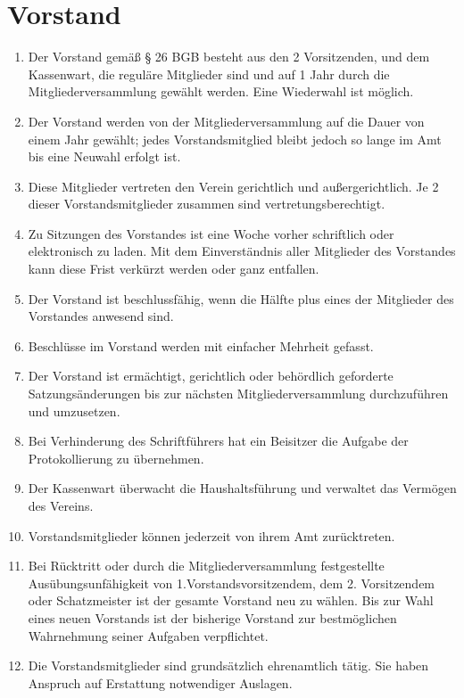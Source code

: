 \documentclass[ngerman]{article}
\begin{document}
\section{Vorstand}
\begin{enumerate}
  \item Der Vorstand gemäß § 26 BGB besteht aus den 2 Vorsitzenden, und dem Kassenwart, die reguläre Mitglieder sind und auf 1 Jahr durch die Mitgliederversammlung gewählt werden. Eine Wiederwahl ist möglich.
  \item Der Vorstand werden von der Mitgliederversammlung auf die Dauer von einem Jahr gewählt; jedes Vorstandsmitglied bleibt jedoch so lange im Amt bis eine Neuwahl erfolgt ist.
  \item Diese Mitglieder vertreten den Verein gerichtlich und außergerichtlich.
  Je 2 dieser Vorstandsmitglieder zusammen sind vertretungsberechtigt.
  \item Zu Sitzungen des Vorstandes ist eine Woche vorher schriftlich oder elektronisch zu laden.
  Mit dem Einverständnis aller Mitglieder des Vorstandes kann diese Frist verkürzt werden oder ganz entfallen.
  \item Der Vorstand ist beschlussfähig, wenn die Hälfte plus eines der Mitglieder des Vorstandes anwesend sind.
  \item Beschlüsse im Vorstand werden mit einfacher Mehrheit gefasst.
  \item Der Vorstand ist ermächtigt, gerichtlich oder behördlich geforderte Satzungsänderungen bis zur nächsten Mitgliederversammlung durchzuführen und umzusetzen.
  \item Bei Verhinderung des Schriftführers hat ein Beisitzer die Aufgabe der Protokollierung zu übernehmen.
  \item Der Kassenwart überwacht die Haushaltsführung und verwaltet das Vermögen des Vereins.
  \item Vorstandsmitglieder können jederzeit von ihrem Amt zurücktreten.
  \item Bei Rücktritt oder durch die Mitgliederversammlung festgestellte Ausübungsunfähigkeit von 1.Vorstandsvorsitzendem, dem 2. Vorsitzendem oder Schatzmeister ist der gesamte Vorstand neu zu wählen.
  Bis zur Wahl eines neuen Vorstands ist der bisherige Vorstand zur bestmöglichen Wahrnehmung seiner Aufgaben verpflichtet.
  \item Die Vorstandsmitglieder sind grundsätzlich ehrenamtlich tätig. Sie haben Anspruch auf Erstattung notwendiger Auslagen.
\end{enumerate}
\end{document}
